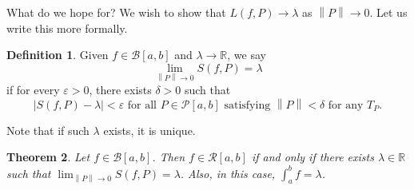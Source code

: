 \documentclass[15pt,a4paper]{book}
\newtheorem{theorem}{Theorem}[chapter]
\theoremstyle{definition}
\newtheorem{definition}[theorem]{Definition}
\newcommand{\abs}[1]{\left| #1 \right|} %
\newcommand{\R}{\mathbb{R}} %
\newcommand{\cP}{\mathcal{P}}
\newcommand{\cR}{\mathcal{R}}
\newcommand{\cB}{\mathcal{B}}
\newcommand{\norm}[1]{\left\lVert#1\right\rVert}
\begin{document}
What do we hope for? We wish to show that $L(f,P) \to \lambda$ as $\norm{P} \to 0$. Let us write this more formally.
\begin{definition}
    Given $f \in \cB[a,b]$ and $\lambda \to \R$, we say
    \begin{equation}
        \lim_{\norm{P} \to 0} S(f,P) = \lambda
    \end{equation}
    if for every $\varepsilon > 0$, there exists $\delta > 0$ such that
    \begin{equation}
        \abs{S(f,P) - \lambda} < \varepsilon \text{ for all } P \in \cP[a,b] \text{ satisfying } \norm{P} < \delta \text{ for any } T_{P}.
    \end{equation}
\end{definition}
Note that if such $\lambda$ exists, it is unique.
\begin{theorem}
    Let $f \in \cB[a,b]$. Then $f \in \cR[a,b]$ if and only if there exists $\lambda \in \R$ such that $\lim_{\norm{P} \to 0} S(f,P) = \lambda$. Also, in this case, $\int_{a}^{b} f = \lambda$.
\end{theorem}
\end{document}

